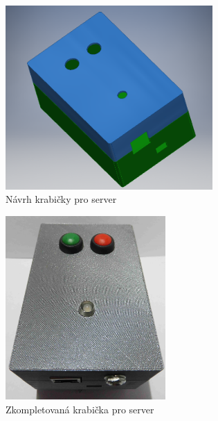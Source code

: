 
\begin{figure}[hbtp]
  \centering
  \includegraphics[height=7cm]{img/foto/server_navrh.png}
  \caption{\label{fig:server_navrh}Návrh krabičky pro server}
\end{figure}

\begin{figure}[hbtp]
  \centering
  \includegraphics[height=7cm]{img/foto/server_realizace.jpg}
  \caption{\label{fig:server_realizace}Zkompletovaná krabička pro server}
\end{figure}


